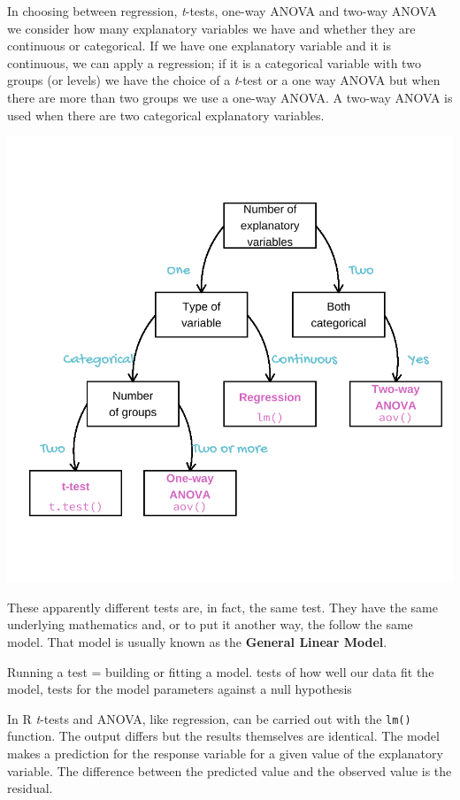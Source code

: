 \documentclass[
]{book}
\begin{document}
In choosing between regression, \emph{t}-tests, one-way ANOVA and two-way ANOVA we consider how many explanatory variables we have and whether they are continuous or categorical. If we have one explanatory variable and it is continuous, we can apply a regression; if it is a categorical variable with two groups (or levels) we have the choice of a \emph{t}-test or a one way ANOVA but when there are more than two groups we use a one-way ANOVA. A two-way ANOVA is used when there are two categorical explanatory variables.

\begin{flushleft}\includegraphics[width=1\linewidth]{images/fig_3} \end{flushleft}

These apparently different tests are, in fact, the same test. They have the same underlying mathematics and, or to put it another way, the follow the same model. That model is usually known as the \textbf{General Linear Model}.

Running a test = building or fitting a model. tests of how well our data fit the model, tests for the model parameters against a null hypothesis

In R \emph{t}-tests and ANOVA, like regression, can be carried out with the \texttt{lm()} function. The output differs but the results themselves are identical. The model makes a prediction for the response variable for a given value of the explanatory variable. The difference between the predicted value and the observed value is the residual.
\end{document}
